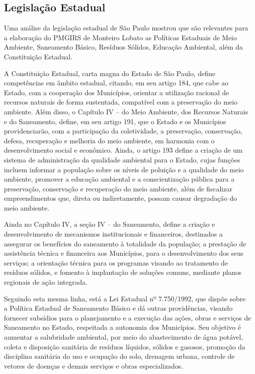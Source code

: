 	\subsection{Legislação Estadual}
	
	Uma análise da legislação estadual de São Paulo mostrou que são relevantes para a elaboração do PMGIRS de Monteiro Lobato as Políticas Estaduais de Meio Ambiente, Saneamento Básico, Resíduos Sólidos, Educação Ambiental, além da Constituição Estadual. 
	
	A Constituição Estadual, carta magna do Estado de São Paulo, define competências em âmbito estadual, citando, em seu artigo 184, que cabe ao Estado, com a cooperação dos Municípios, orientar a utilização racional de recursos naturais de forma sustentada, compatível com a preservação do meio ambiente. Além disso, o Capítulo IV – do Meio Ambiente, dos Recursos Naturais e do Saneamento, define, em seu artigo 191, que o Estado e os Municípios providenciarão, com a participação da coletividade, a preservação, conservação, defesa, recuperação e melhoria do meio ambiente, em harmonia com o desenvolvimento social e econômico. Ainda, o artigo 193 define a criação de um sistema de administração da qualidade ambiental para o Estado, cujas funções incluem informar a população sobre os níveis de poluição e a qualidade do meio ambiente, promover a educação ambiental e a conscientização pública para a preservação, conservação e recuperação do meio ambiente, além de fiscalizar empreendimentos que, direta ou indiretamente, possam causar degradação do meio ambiente.
	
	Ainda no Capítulo IV, a seção IV – do Saneamento, define a criação e desenvolvimento de mecanismos institucionais e financeiros, destinados a assegurar os benefícios do saneamento à totalidade da população; a prestação de assistência técnica e financeira aos Municípios, para o desenvolvimento dos seus serviços; a orientação técnica para os programas visando ao tratamento de resíduos sólidos, e fomento à implantação de soluções comuns, mediante planos regionais de ação integrada.
	
	Seguindo esta mesma linha, está a Lei Estadual nº 7.750/1992, que dispõe sobre a Política Estadual de Saneamento Básico e dá outras providências, visando fornecer subsídios para o planejamento e a execução das ações, obras e serviços de Saneamento no Estado, respeitada a autonomia dos Municípios. Seu objetivo é aumentar a salubridade ambiental, por meio do abastecimento de água potável, coleta e disposição sanitária de resíduos líquidos, sólidos e gasosos, promoção da disciplina sanitária do uso e ocupação do solo, drenagem urbana, controle de vetores de doenças e demais serviços e obras especializados.
	
